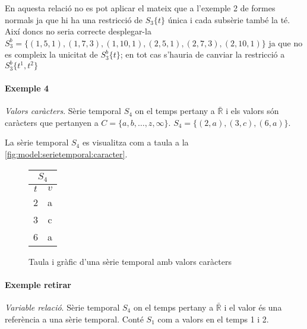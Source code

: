  En aquesta relació no es pot aplicar el mateix que a
l'exemple 2 de formes normals ja que hi ha una restricció de $S_3\{t\}$
única i cada subsèrie també la té.  Així doncs no seria correcte
desplegar-la $S^b_3 = \{ (1,5,1), (1,7,3), (1,10,1), (2,5,1),
(2,7,3),(2,10,1)\}$ ja que no es compleix la unicitat de $S^b_3 \{t\}$; en tot cas s'hauria de canviar la restricció a $S^b_3 \{t^1,t^2\}$








\paragraph{Exemple 4} \emph{Valors caràcters}.
Sèrie temporal $S_4$ on el temps pertany a $\bar{\mathbb{R}}$ i els valors són caràcters que pertanyen a $C=\{a,b,\dotsc,z,\infty\}$. $S_4 = \{ (2,a), (3,c), (6,a) \}$.

La sèrie temporal $S_4$ es visualitza com a taula a la \autoref{fig:model:serietemporal:caracter}.

\begin{figure}[tp]
  \centering
  \begin{tabular}[c]{|c|c|}
    \multicolumn{2}{c}{$S_4$} \\ \hline
    $t$  & $v$ \\ \hline
    2  & a \\
    3  & c \\
    6  & a \\ \hline
  \end{tabular} \qquad
  \caption{Taula i gràfic d'una sèrie temporal amb valors caràcters}
  \label{fig:model:serietemporal:caracter}
\end{figure}





\paragraph{Exemple retirar} \emph{Variable relació}.
Sèrie temporal $S_4$ on el temps pertany a $\bar{\mathbb{R}}$ i el valor és una referència a una sèrie temporal. Conté $S_1$ com a valors en el temps 1 i 2. 

